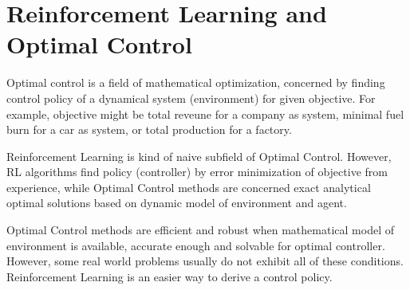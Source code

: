 \section{Reinforcement Learning and Optimal Control}
\label{sec:rl_and_control}

Optimal control is a field of mathematical optimization, concerned by  finding control policy of a dynamical system (environment) for given objective. For example, objective might be total reveune for a company as system, minimal fuel burn for a car as system, or total production for a factory.

Reinforcement Learning is kind of naive subfield of Optimal Control. However, RL algorithms find policy (controller) by error minimization of objective from experience, while Optimal Control methods are concerned exact analytical optimal solutions based on dynamic model of environment and agent.

Optimal Control methods are efficient and robust when mathematical model of environment is available, accurate enough and solvable for optimal controller. However, some real world problems usually do not exhibit all of these conditions. Reinforcement Learning is an easier way to derive a control policy.